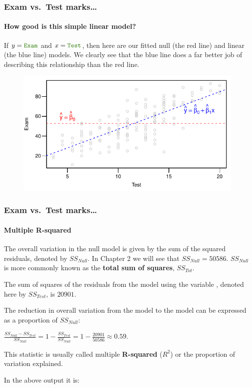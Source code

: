 \documentclass{beamer}\usepackage[]{graphicx}\usepackage[]{xcolor}
\begin{document}
\begin{frame}[fragile]
\frametitle{Exam vs.\ Test marks\ldots}
\framesubtitle{How good is this simple linear model?}

If $y=\rcode{Exam}$ and $x=\rcode{Test}$, then here are our fitted null (the {\color{red} red} line) and linear (the {\color{blue} blue} line) models. We clearly see that the blue line does a far better job of describing this relationship than the red line.  




\begin{figure}
  \centering
  \includegraphics{figure/RC-H01-020A}
\end{figure}

\end{frame}


\begin{frame}[fragile]
\frametitle{Exam vs.\ Test marks\ldots}
\framesubtitle{Multiple R-squared}

The overall variation in the null model is given by the sum of the squared residuals, 
denoted by $SS_{Null}$.
In Chapter 2 we will see that $SS_{Null}=50586$.
$SS_{Null}$ is more commonly known as the {\bf total sum of squares}, $SS_{Tot}$.

The sum of squares of the residuals from the model using the variable , 
denoted here by $SS_{Test}$, is $20901$.

The reduction in overall variation from the  model to the  model can be expressed as a proportion of $SS_{Null}$:

\medskip 
\begin{center}
$\frac{SS_{Null} - SS_{Test}}{SS_{Null}}=1-\frac{SS_{Test}}{SS_{Null}} =1-\frac{20901}{50586}\approx 0.59.$
\end{center}

This statistic is usually called multiple {\bf R-squared} ($R^2$) or the proportion of variation explained.

\medskip
In the above output it is: 
\end{frame}
\end{document}
